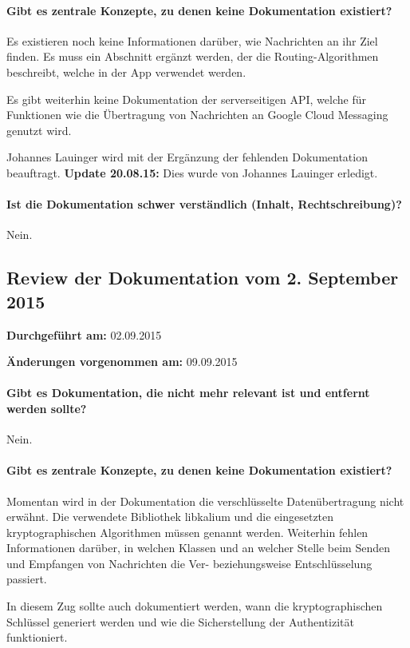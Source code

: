 \paragraph{Gibt es zentrale Konzepte, zu denen keine Dokumentation existiert?}
Es existieren noch keine Informationen darüber, wie Nachrichten an ihr Ziel finden. Es muss ein Abschnitt ergänzt werden, der die Routing-Algorithmen beschreibt, welche in der App verwendet werden.

Es gibt weiterhin keine Dokumentation der serverseitigen API, welche für Funktionen wie die Übertragung von Nachrichten an Google Cloud Messaging genutzt wird.

Johannes Lauinger wird mit der Ergänzung der fehlenden Dokumentation beauftragt. \textbf{Update 20.08.15:} Dies wurde von Johannes Lauinger erledigt.

\paragraph{Ist die Dokumentation schwer verständlich (Inhalt, Rechtschreibung)?}
Nein.


\subsection{Review der Dokumentation vom 2. September 2015}

\textbf{Durchgeführt am:} 02.09.2015

\textbf{Änderungen vorgenommen am:} 09.09.2015

\paragraph{Gibt es Dokumentation, die nicht mehr relevant ist und entfernt werden sollte?}
Nein.

\paragraph{Gibt es zentrale Konzepte, zu denen keine Dokumentation existiert?}
Momentan wird in der Dokumentation die verschlüsselte Datenübertragung nicht erwähnt. Die verwendete Bibliothek libkalium und die eingesetzten kryptographischen Algorithmen müssen genannt werden. Weiterhin fehlen Informationen darüber, in welchen Klassen und an welcher Stelle beim Senden und Empfangen von Nachrichten die Ver- beziehungsweise Entschlüsselung passiert.

In diesem Zug sollte auch dokumentiert werden, wann die kryptographischen Schlüssel generiert werden und wie die Sicherstellung der Authentizität funktioniert.

